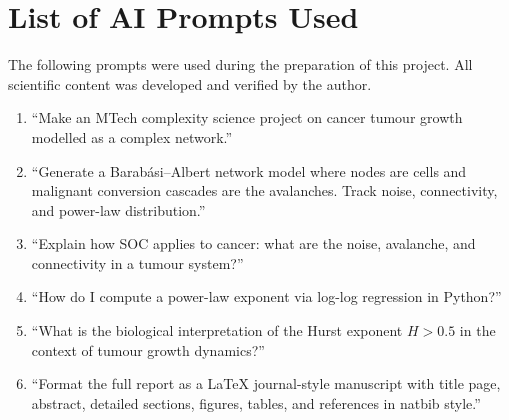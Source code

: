 \documentclass[12pt,a4paper]{article}
\begin{document}
\newpage
\appendix
\section{List of AI Prompts Used}

The following prompts were used during the preparation of this project.
All scientific content was developed and verified by the author.

\begin{enumerate}[leftmargin=1.5em]
  \item ``Make an MTech complexity science project on cancer tumour growth
        modelled as a complex network.''
  \item ``Generate a Barab\'{a}si--Albert network model where nodes are cells
        and malignant conversion cascades are the avalanches.  Track noise,
        connectivity, and power-law distribution.''
  \item ``Explain how SOC applies to cancer: what are the noise, avalanche,
        and connectivity in a tumour system?''
  \item ``How do I compute a power-law exponent via log-log regression in Python?''
  \item ``What is the biological interpretation of the Hurst exponent $H > 0.5$
        in the context of tumour growth dynamics?''
  \item ``Format the full report as a LaTeX journal-style manuscript with
        title page, abstract, detailed sections, figures, tables, and
        references in natbib style.''
\end{enumerate}
\end{document}
